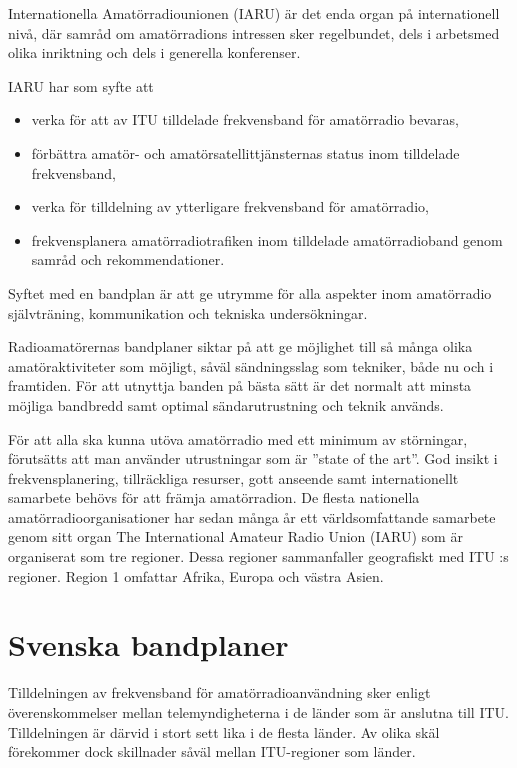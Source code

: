 Internationella Amatörradiounionen (IARU) är det enda organ på internationell
nivå, där samråd om amatörradions intressen sker regelbundet, dels i arbetsmed
olika inriktning och dels i generella konferenser.

IARU har som syfte att

\begin{itemize}
\item verka för att av ITU tilldelade frekvensband för amatörradio bevaras,
\item förbättra amatör- och amatörsatellittjänsternas status inom tilldelade
  frekvensband,
\item verka för tilldelning av ytterligare frekvensband för amatörradio,
\item frekvensplanera amatörradiotrafiken inom tilldelade amatörradioband genom
  samråd och rekommendationer.
\end{itemize}

Syftet med en bandplan är att ge utrymme för alla aspekter inom amatörradio
självträning, kommunikation och tekniska undersökningar.

Radioamatörernas bandplaner siktar på att ge möjlighet till så många olika
amatöraktiviteter som möjligt, såväl sändningsslag som tekniker, både nu och i
framtiden. För att utnyttja banden på bästa sätt är det normalt att minsta
möjliga bandbredd samt optimal sändarutrustning och teknik används.

För att alla ska kunna utöva amatörradio med ett minimum av störningar,
förutsätts att man använder utrustningar som är ''state of the art''.  God
insikt i frekvensplanering, tillräckliga resurser, gott anseende samt
internationellt samarbete behövs för att främja amatörradion. De flesta
nationella amatörradioorganisationer har sedan många år ett världsomfattande
samarbete genom sitt organ The International Amateur Radio Union (IARU) som är
organiserat som tre regioner. Dessa regioner sammanfaller geografiskt med ITU :s
regioner. Region 1 omfattar Afrika, Europa och västra Asien.

\section{Svenska bandplaner}

Tilldelningen av frekvensband för amatörradioanvändning sker enligt
överenskommelser mellan telemyndigheterna i de länder som är anslutna till
ITU.
Tilldelningen är därvid i stort sett lika i de flesta länder.
Av olika skäl förekommer dock skillnader såväl mellan ITU-regioner som länder.

